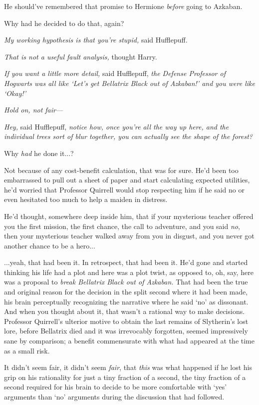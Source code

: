 He should’ve remembered that promise to Hermione \emph{before} going to Azkaban.

Why had he decided to do that, again?

\emph{My working hypothesis is that you’re stupid,} said Hufflepuff.

\emph{That is not a useful fault analysis,} thought Harry.

\emph{If you want a little more detail,} said Hufflepuff, \emph{the Defense Professor of Hogwarts was all like ‘Let’s get Bellatrix Black out of Azkaban!’ and you were like ‘Okay!’}

\emph{Hold on,  not fair—}

\emph{Hey,} said Hufflepuff, \emph{notice how, once you’re all the way up here, and the individual trees sort of blur together, you can actually see the shape of the forest?}

Why \emph{had} he done it...?

Not because of any cost-benefit calculation, that was for sure. He’d been too embarrassed to pull out a sheet of paper and start calculating expected utilities, he’d worried that Professor Quirrell would stop respecting him if he said no or even hesitated too much to help a maiden in distress.

He’d thought, somewhere deep inside him, that if your mysterious teacher offered you the first mission, the first chance, the call to adventure, and you said \emph{no}, then your mysterious teacher walked away from you in disgust, and you never got another chance to be a hero...

...yeah, that had been it. In retrospect, that had been it. He’d gone and started thinking his life had a plot and here was a plot twist, as opposed to, oh, say, here was a proposal to \emph{break Bellatrix Black out of Azkaban.} That had been the true and original reason for the decision in the split second where it had been made, his brain perceptually recognizing the narrative where he said ‘no’ as dissonant. And when you thought about it, that wasn’t a rational way to make decisions. Professor Quirrell’s ulterior motive to obtain the last remains of Slytherin’s lost lore, before Bellatrix died and it was irrevocably forgotten, seemed impressively sane by comparison; a benefit commensurate with what had appeared at the time as a small risk.

It didn’t seem fair, it didn’t seem \emph{fair}, that \emph{this} was what happened if he lost his grip on his rationality for just a tiny fraction of a second, the tiny fraction of a second required for his brain to decide to be more comfortable with ‘yes’ arguments than ‘no’ arguments during the discussion that had followed.

